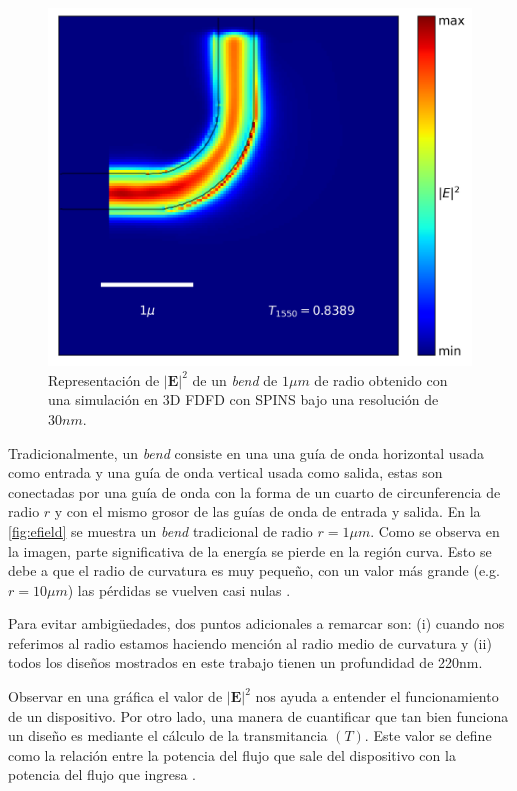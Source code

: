 \begin{figure}[ht]
  \centering
  \includegraphics[scale=0.7]{image/theory/bend_field_dx30_px16_rint1000.png}
  \caption{Representación de $|\boldsymbol{E}|^2$ de un \emph{bend} de $1 \mu m$ de radio obtenido con una simulación en 3D FDFD con SPINS
  bajo una resolución de $30 nm$.}
  \label{fig:efield}
\end{figure}


Tradicionalmente, un \emph{bend} consiste en una una guía de onda horizontal usada como entrada y
una guía de onda vertical usada como salida, estas son conectadas por una guía de onda con la forma de un
cuarto de circunferencia de radio $r$ y con el mismo grosor de las guías de onda de entrada y salida.
En la \autoref{fig:efield} se muestra un \emph{bend} tradicional de radio $r = 1 \mu m$.
Como se observa en la imagen, parte significativa de la energía se pierde en la región curva.
Esto se debe a que el radio de curvatura es muy pequeño, con un valor más grande (e.g. $r = 10 \mu m$) 
las pérdidas se vuelven casi nulas \citep{LukasChrostowski2010}.


Para evitar ambigüedades, dos puntos adicionales a remarcar son: 
(i) cuando nos referimos al radio estamos haciendo mención al radio medio de curvatura y 
(ii) todos los diseños mostrados en este trabajo tienen un profundidad de 220nm.

Observar en una gráfica el valor de $|\boldsymbol{E}|^2$ nos ayuda a entender el funcionamiento de un dispositivo.
Por otro lado, una manera de cuantificar que tan bien funciona un diseño es mediante el cálculo de la
transmitancia $(T)$.
Este valor se define como la relación entre la potencia del flujo que sale del dispositivo con la 
potencia del flujo que ingresa \citep{Christiansen2021}.

